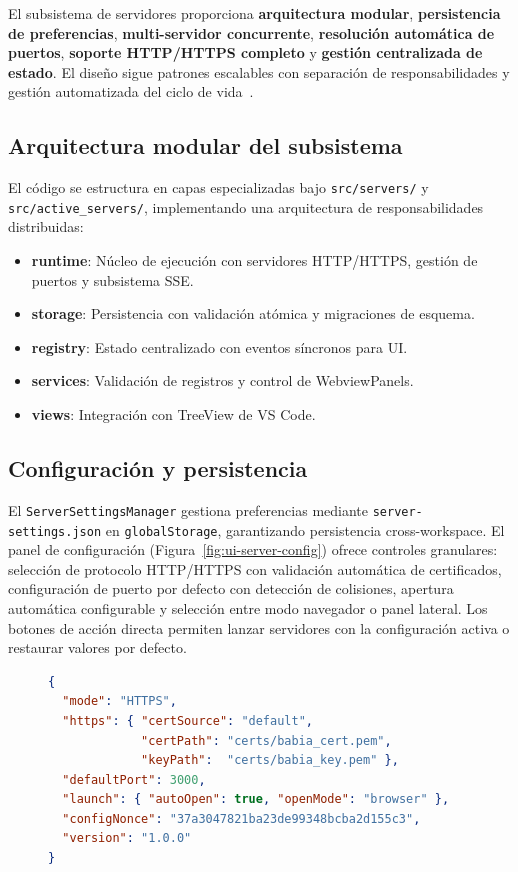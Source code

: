\documentclass[a4paper, 12pt]{book}
\begin{document}
El subsistema de servidores proporciona \textbf{arquitectura modular}, \textbf{persistencia de preferencias}, \textbf{multi-servidor concurrente}, \textbf{resolución automática de puertos}, \textbf{soporte HTTP/HTTPS completo} y \textbf{gestión centralizada de estado}. El diseño sigue patrones escalables con separación de responsabilidades y gestión automatizada del ciclo de vida~\cite{code-xr}.

\subsection{Arquitectura modular del subsistema}
El código se estructura en capas especializadas bajo \texttt{src/servers/} y \texttt{src/active\_servers/}, implementando una arquitectura de responsabilidades distribuidas:

\begin{itemize}
  \item \textbf{runtime}: Núcleo de ejecución con servidores HTTP/HTTPS, gestión de puertos y subsistema SSE.
  \item \textbf{storage}: Persistencia con validación atómica y migraciones de esquema.
  \item \textbf{registry}: Estado centralizado con eventos síncronos para UI.
  \item \textbf{services}: Validación de registros y control de WebviewPanels.
  \item \textbf{views}: Integración con TreeView de VS Code.
\end{itemize}

\subsection{Configuración y persistencia}
El \texttt{ServerSettingsManager} gestiona preferencias mediante \texttt{server-settings.json} en \texttt{globalStorage}, garantizando persistencia cross-workspace. El panel de configuración (Figura~\ref{fig:ui-server-config}) ofrece controles granulares: selección de protocolo HTTP/HTTPS con validación automática de certificados, configuración de puerto por defecto con detección de colisiones, apertura automática configurable y selección entre modo navegador o panel lateral. Los botones de acción directa permiten lanzar servidores con la configuración activa o restaurar valores por defecto.

\begin{figure}[H]
\centering
\begin{minipage}{0.9\linewidth}
\begin{lstlisting}[language=json,
caption={Configuración de servidores en Code-XR.},
label={fig:server-settings-json}]
{
  "mode": "HTTPS",
  "https": { "certSource": "default",
             "certPath": "certs/babia_cert.pem",
             "keyPath":  "certs/babia_key.pem" },
  "defaultPort": 3000,
  "launch": { "autoOpen": true, "openMode": "browser" },
  "configNonce": "37a3047821ba23de99348bcba2d155c3",
  "version": "1.0.0"
}
\end{lstlisting}
\end{minipage}
\end{figure}
\end{document}

